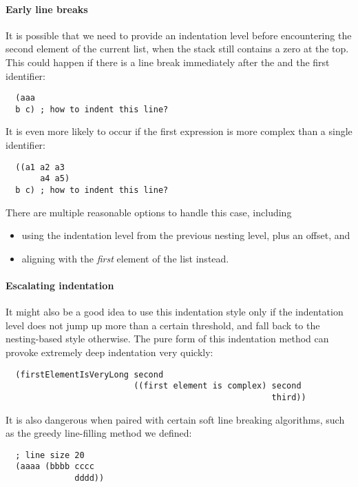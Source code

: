 \paragraph{Early line breaks}
It is possible that we need to provide an indentation level
before encountering the second element of the current list,
when the stack still contains a zero at the top.
This could happen if there is a line break immediately after the
 and the first identifier:
\begin{verbatim}
  (aaa
  b c) ; how to indent this line?
\end{verbatim}
It is even more likely to occur if the first expression
is more complex than a single identifier:
\begin{verbatim}
  ((a1 a2 a3
       a4 a5)
  b c) ; how to indent this line?
\end{verbatim}
There are multiple reasonable options to handle this case, including
\begin{itemize}
  \item using the indentation level from the previous nesting level, plus an offset, and
  \item aligning with the \textit{first} element of the list instead.
\end{itemize}

\paragraph{Escalating indentation}
It might also be a good idea to use this indentation style only if
the indentation level does not jump up more than a certain threshold,
and fall back to the nesting-based style otherwise.
The pure form of this indentation method can
provoke extremely deep indentation very quickly:
\begin{verbatim}
  (firstElementIsVeryLong second
                          ((first element is complex) second
                                                      third))
\end{verbatim}
It is also dangerous when paired with certain soft line breaking algorithms,
such as the greedy line-filling method we defined:
\begin{verbatim}
  ; line size 20
  (aaaa (bbbb cccc
              dddd))
\end{verbatim}
